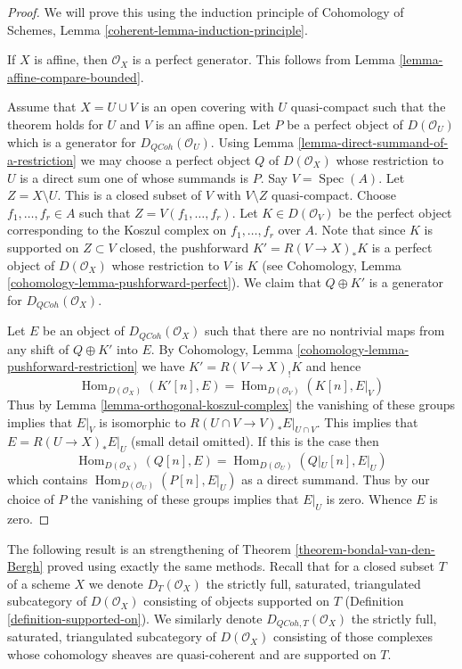 \documentclass{stacks-project}
\theoremstyle{plain}
\theoremstyle{definition}
\theoremstyle{remark}
\numberwithin{equation}{subsection}
\def\Spec{\mathop{\mathrm{Spec}}}
\def\Hom{\mathop{\mathrm{Hom}}\nolimits}
\def\QCoh{\mathit{QCoh}}
\begin{document}
\begin{proof}
We will prove this using the induction principle of
Cohomology of Schemes, Lemma \ref{coherent-lemma-induction-principle}.

\medskip\noindent
If $X$ is affine, then $\mathcal{O}_X$ is a perfect generator.
This follows from Lemma \ref{lemma-affine-compare-bounded}.

\medskip\noindent
Assume that $X = U \cup V$ is an open covering with $U$ quasi-compact
such that the theorem holds for $U$ and $V$ is an affine open.
Let $P$ be a perfect object of $D(\mathcal{O}_U)$ which is a generator
for $D_\QCoh(\mathcal{O}_U)$. Using
Lemma \ref{lemma-direct-summand-of-a-restriction} we may
choose a perfect object
$Q$ of $D(\mathcal{O}_X)$ whose restriction to $U$ is a direct sum one
of whose summands is $P$. Say $V = \Spec(A)$. Let $Z = X \setminus U$.
This is a closed subset of $V$ with $V \setminus Z$ quasi-compact.
Choose $f_1, \ldots, f_r \in A$ such that
$Z = V(f_1, \ldots, f_r)$. Let $K \in D(\mathcal{O}_V)$ be the perfect
object corresponding to the Koszul complex on $f_1, \ldots, f_r$ over $A$.
Note that since $K$ is supported on $Z \subset V$ closed, the pushforward
$K' = R(V \to X)_*K$ is a perfect object of $D(\mathcal{O}_X)$ whose
restriction to $V$ is $K$ (see
Cohomology, Lemma \ref{cohomology-lemma-pushforward-perfect}).
We claim that $Q \oplus K'$ is a generator for
$D_\QCoh(\mathcal{O}_X)$.

\medskip\noindent
Let $E$ be an object of $D_\QCoh(\mathcal{O}_X)$ such that
there are no nontrivial maps from any shift of $Q \oplus K'$ into $E$.
By Cohomology, Lemma \ref{cohomology-lemma-pushforward-restriction}
we have $K' =  R(V \to X)_! K$ and hence
$$
\Hom_{D(\mathcal{O}_X)}(K'[n], E) = \Hom_{D(\mathcal{O}_V)}(K[n], E|_V)
$$
Thus by Lemma \ref{lemma-orthogonal-koszul-complex} the vanishing of
these groups implies that $E|_V$ is isomorphic to
$R(U \cap V \to V)_*E|_{U \cap V}$. This implies that $E = R(U \to X)_*E|_U$
(small detail omitted). If this is the case then
$$
\Hom_{D(\mathcal{O}_X)}(Q[n], E) = \Hom_{D(\mathcal{O}_U)}(Q|_U[n], E|_U)
$$
which contains $\Hom_{D(\mathcal{O}_U)}(P[n], E|_U)$ as a direct summand.
Thus by our choice of $P$ the vanishing of these groups implies that $E|_U$
is zero. Whence $E$ is zero.
\end{proof}

\noindent
The following result is an strengthening of
Theorem \ref{theorem-bondal-van-den-Bergh}
proved using exactly the same methods.
Recall that for a closed subset $T$ of a scheme $X$ we denote
$D_T(\mathcal{O}_X)$ the strictly full, saturated,
triangulated subcategory of $D(\mathcal{O}_X)$ consisting of objects
supported on $T$ (Definition \ref{definition-supported-on}).
We similarly denote $D_{\QCoh, T}(\mathcal{O}_X)$ the strictly full, saturated,
triangulated subcategory of $D(\mathcal{O}_X)$ consisting of those
complexes whose cohomology sheaves are quasi-coherent and are supported
on $T$.
\end{document}

